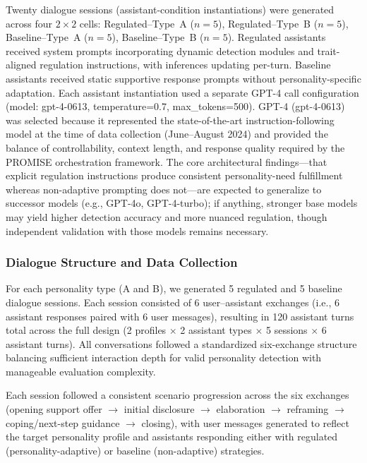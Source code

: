 Twenty dialogue sessions (assistant-condition instantiations) were generated across four $2 \times 2$ cells: Regulated--Type~A ($n=5$), Regulated--Type~B ($n=5$), Baseline--Type~A ($n=5$), Baseline--Type~B ($n=5$). Regulated assistants received system prompts incorporating dynamic detection modules and trait-aligned regulation instructions, with inferences updating per-turn. Baseline assistants received static supportive response prompts without personality-specific adaptation. Each assistant instantiation used a separate GPT-4 call configuration (model: gpt-4-0613, temperature=0.7, max\_tokens=500). GPT-4 (gpt-4-0613) was selected because it represented the state-of-the-art instruction-following model at the time of data collection (June--August 2024) and provided the balance of controllability, context length, and response quality required by the PROMISE orchestration framework. The core architectural findings---that explicit regulation instructions produce consistent personality-need fulfillment whereas non-adaptive prompting does not---are expected to generalize to successor models (e.g., GPT-4o, GPT-4-turbo); if anything, stronger base models may yield higher detection accuracy and more nuanced regulation, though independent validation with those models remains necessary.

\subsubsection{Dialogue Structure and Data Collection}\label{dialogue-structure-and-data-collection}

For each personality type (A and B), we generated 5 regulated and 5 baseline dialogue sessions. Each session consisted of 6 user--assistant exchanges (i.e., 6 assistant responses paired with 6 user messages), resulting in 120 assistant turns total across the full design (2 profiles $\times$ 2 assistant types $\times$ 5 sessions $\times$ 6 assistant turns). All conversations followed a standardized six-exchange structure balancing sufficient interaction depth for valid personality detection with manageable evaluation complexity.

Each session followed a consistent scenario progression across the six exchanges (opening support offer $\rightarrow$ initial disclosure $\rightarrow$ elaboration $\rightarrow$ reframing $\rightarrow$ coping/next-step guidance $\rightarrow$ closing), with user messages generated to reflect the target personality profile and assistants responding either with regulated (personality-adaptive) or baseline (non-adaptive) strategies.

